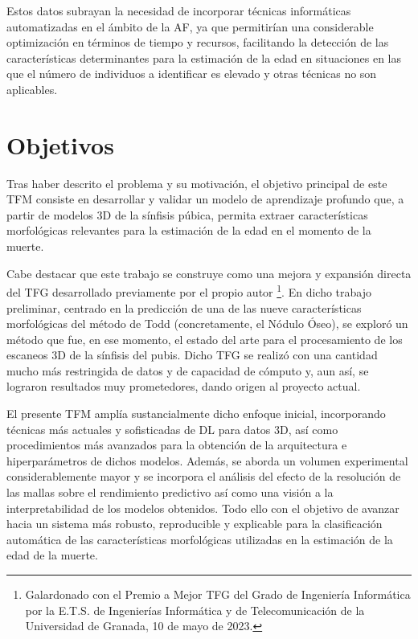 Estos datos subrayan la necesidad de incorporar técnicas informáticas automatizadas en el ámbito de la AF, ya que permitirían una considerable optimización en términos de tiempo y recursos, facilitando la detección de las características determinantes para la estimación de la edad en situaciones en las que el número de individuos a identificar es elevado y otras técnicas no son aplicables.

\section{Objetivos}

Tras haber descrito el problema y su motivación, el objetivo principal de este TFM consiste en desarrollar y validar un modelo de aprendizaje profundo que, a partir de modelos 3D de la sínfisis púbica, permita extraer características morfológicas relevantes para la estimación de la edad en el momento de la muerte.

Cabe destacar que este trabajo se construye como una mejora y expansión directa del TFG desarrollado previamente por el propio autor \cite{lugli_tfg_2022}\footnote{Galardonado con el Premio a Mejor TFG del Grado de Ingeniería Informática por la E.T.S. de Ingenierías Informática y de Telecomunicación de la Universidad de Granada, 10 de mayo de 2023.}. En dicho trabajo preliminar, centrado en la predicción de una de las nueve características morfológicas del método de Todd (concretamente, el Nódulo Óseo), se exploró un método que fue, en ese momento, el estado del arte para el procesamiento de los escaneos 3D de la sínfisis del pubis. Dicho TFG se realizó con una cantidad mucho más restringida de datos y de capacidad de cómputo y, aun así, se lograron resultados muy prometedores, dando origen al proyecto actual.

El presente TFM amplía sustancialmente dicho enfoque inicial, incorporando técnicas más actuales y sofisticadas de DL para datos 3D, así como procedimientos más avanzados para la obtención de la arquitectura e hiperparámetros de dichos modelos. Además, se aborda un volumen experimental considerablemente mayor y se incorpora el análisis del efecto de la resolución de las mallas sobre el rendimiento predictivo así como una visión a la interpretabilidad de los modelos obtenidos. Todo ello con el objetivo de avanzar hacia un sistema más robusto, reproducible y explicable para la clasificación automática de las características morfológicas utilizadas en la estimación de la edad de la muerte.

